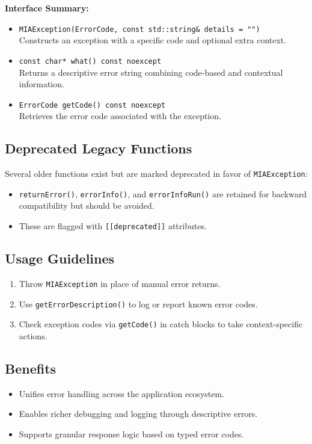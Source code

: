 \textbf{Interface Summary:}
\begin{itemize}
	\item \texttt{MIAException(ErrorCode, const std::string\& details = "")} \\
	Constructs an exception with a specific code and optional extra context.
	\item \texttt{const char* what() const noexcept} \\
	Returns a descriptive error string combining code-based and contextual information.
	\item \texttt{ErrorCode getCode() const noexcept} \\
	Retrieves the error code associated with the exception.
\end{itemize}

\subsection*{Deprecated Legacy Functions}
Several older functions exist but are marked deprecated in favor of \texttt{MIAException}:
\begin{itemize}
	\item \texttt{returnError()}, \texttt{errorInfo()}, and \texttt{errorInfoRun()} are retained for backward compatibility but should be avoided.
	\item These are flagged with \texttt{[[deprecated]]} attributes.
\end{itemize}

\subsection*{Usage Guidelines}
\begin{enumerate}
	\item Throw \texttt{MIAException} in place of manual error returns.
	\item Use \texttt{getErrorDescription()} to log or report known error codes.
	\item Check exception codes via \texttt{getCode()} in catch blocks to take context-specific actions.
\end{enumerate}

\subsection*{Benefits}
\begin{itemize}
	\item Unifies error handling across the application ecosystem.
	\item Enables richer debugging and logging through descriptive errors.
	\item Supports granular response logic based on typed error codes.
\end{itemize}








